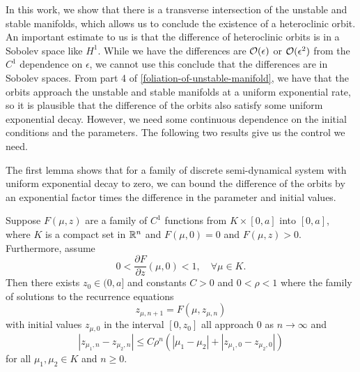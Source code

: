 In this work, we show that there is a transverse intersection of the unstable and stable manifolds, which allows us to conclude the existence of a heteroclinic orbit. An important estimate to us is that the difference of heteroclinic orbits is in a Sobolev space like \(H^1\). While we have the differences are \(\mathcal{O}(\epsilon)\) or \(\mathcal{O}(\epsilon^2)\) from the \(C^1\) dependence on \(\epsilon\), we cannot use this conclude that the differences are in Sobolev spaces. From part 4 of \cref{foliation-of-unstable-manifold}, we have that the orbits approach the unstable and stable manifolds at a uniform exponential rate, so it is plausible that the difference of the orbits also satisfy some uniform exponential decay. However, we need some continuous dependence on the initial conditions and the parameters. The following two results give us the control we need.

The first lemma shows that for a family of discrete semi-dynamical system with uniform exponential decay to zero, we can bound the difference of the orbits by an exponential factor times the difference in the parameter and initial values.

\begin{lem}\label{discrete-gronwall-estimate}
	Suppose \(F(\mu, z)\) are a family of \(C^1\) functions from \(K \times [0,a]\) into \([0,a]\), where \(K\) is a compact set in \(\mathbb{R}^n\) and \(F(\mu, 0) = 0\) and \(F(\mu, z) > 0\). Furthermore, assume
	\begin{equation*}
		0< \frac{\partial F}{\partial z} (\mu , 0) < 1, \quad \forall \mu \in K.
	\end{equation*}
	Then there exists \(z_0 \in (0,a]\) and constants \(C> 0\) and \(0<\rho< 1\) where the family of solutions to the recurrence equations
	\begin{equation*}
		z_{\mu, n+1} = F(\mu, z_{\mu, n})
	\end{equation*}
	with initial values \(z_{\mu, 0}\) in the interval \([0,z_0]\) all approach \(0\) as \(n\to \infty\) and
	\begin{equation*}
		|z_{\mu_1,n} - z_{\mu_2,n} | \leq C \rho^n( |\mu_1- \mu_2| + |z_{\mu_1,0} - z_{\mu_2,0}|)
	\end{equation*}
	for all \(\mu_1,\mu_2 \in K\) and \(n\geq 0\).
\end{lem}

